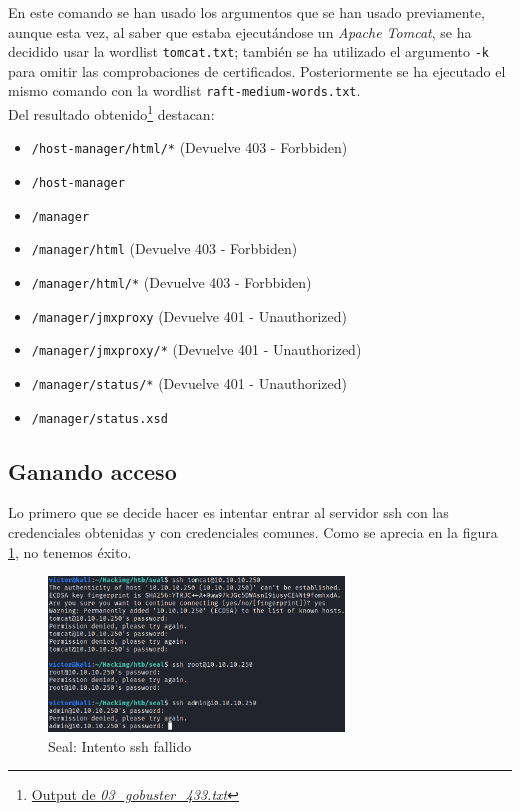 En este comando se han usado los argumentos que se han usado previamente, aunque esta vez, al saber que estaba ejecutándose un \textit{Apache Tomcat}, se ha decidido usar la wordlist \texttt{tomcat.txt}; también se ha utilizado el argumento \texttt{-k} para omitir las comprobaciones de certificados. Posteriormente se ha ejecutado el mismo comando con la wordlist \texttt{raft-medium-words.txt}.\\

Del resultado obtenido\footnote{\href{https://github.com/VictorNS69/TFM/blob/main/machines/seal/03_gobuster_433.txt}{Output de \textit{03\_gobuster\_433.txt}}} destacan:

\begin{itemize}
    \item \texttt{/host-manager/html/*} (Devuelve 403 - Forbbiden)
    \item \texttt{/host-manager}
    \item \texttt{/manager}
    \item \texttt{/manager/html} (Devuelve 403 - Forbbiden)
    \item \texttt{/manager/html/*} (Devuelve 403 - Forbbiden)
    \item \texttt{/manager/jmxproxy} (Devuelve 401 - Unauthorized)
    \item \texttt{/manager/jmxproxy/*} (Devuelve 401 - Unauthorized)
    \item \texttt{/manager/status/*} (Devuelve 401 - Unauthorized)
    \item \texttt{/manager/status.xsd}
\end{itemize}

\subsection{Ganando acceso}

Lo primero que se decide hacer es intentar entrar al servidor \acrshort{ssh} con las credenciales obtenidas y con credenciales comunes. Como se aprecia en la figura \ref{fig:seal-ssh-facil}, no tenemos éxito.

\begin{figure}[h]
    \centering
    \includegraphics[width=0.70\textwidth]{images/machines/seal/ssh-tomcat.png}
    \caption{Seal: Intento \acrshort{ssh} fallido}
    \label{fig:seal-ssh-facil}
\end{figure}

